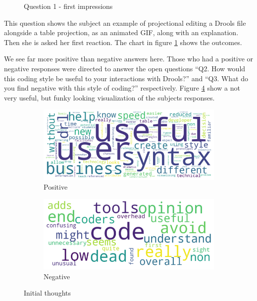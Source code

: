 \begin{figure}[H]
    \centering
    \caption{Question 1 - first impressions}
    \label{fig:stackedbar_Q1}
\end{figure}

This question shows the subject an example of projectional editing a Drools file alongside a table projection, as an animated GIF, along with an explanation.
Then she is asked her first reaction. The chart in figure \ref{fig:stackedbar_Q1} shows the outcomes.

We see far more positive than negative answers here.
Those who had a positive or negative responses were directed to answer the open questions ``Q2. How would this coding style be useful to your interactions with Drools?'' and ``Q3. What do you find negative with this style of coding?'' respectively.
Figure \ref{fig:wordclouds} show a not very useful, but funky looking visualization of the subjects responses.

\begin{figure}[H]
    \begin{subfigure}{.60\textwidth}
      \centering
      \includegraphics[width=.95\linewidth]{Sections/images/positive_wordcloud.png}
      \caption{Positive}
      \label{fig:wfig1}
    \end{subfigure}%
    \begin{subfigure}{.40\textwidth}
      \centering
      \includegraphics[width=.95\linewidth]{Sections/images/negative_wordcloud.png}
      \caption{Negative}
      \label{fig:wfig2}
    \end{subfigure}
    \caption{Initial thoughts}
    \label{fig:wordclouds}
\end{figure}

